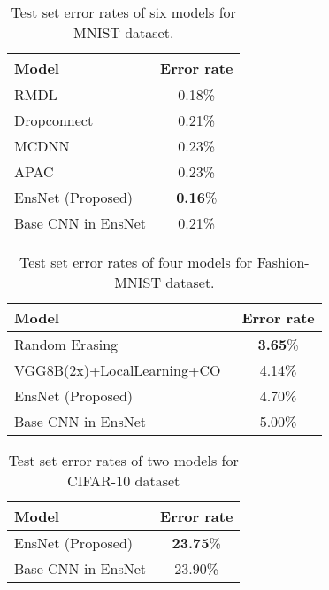 \documentclass[a4j]{article}
\begin{document}
\begin{table}[t]
  \centering
  \caption{Test set error rates of six models for MNIST dataset.}
  \begin{tabular}[t]{|l|c|} \hline
    Model & Error rate\\
    \hline \hline
    RMDL~\cite{RMDL} & 0.18\%\\ \hline
    Dropconnect~\cite{Dropconnect} & 0.21\%\\ \hline
    MCDNN~\cite{MCDNN} & 0.23\%\\ \hline
    APAC~\cite{APAC} & 0.23\%\\ \hline
    EnsNet (Proposed) & \textbf{0.16}\% \\ \hline
    Base CNN in EnsNet & 0.21\% \\ \hline
  \end{tabular}
  \label{tb:prediction-error1}
\end{table}

\begin{table}[t]
  \centering
  \caption{Test set error rates of four models for Fashion-MNIST dataset.}
  \begin{tabular}[t]{|l|c|} \hline
    Model & Error rate \\
    \hline \hline
    Random Erasing~\cite{RandomErasing} & \textbf{3.65}\% \\ \hline
    VGG8B(2x)+LocalLearning+CO~\cite{VGG8LCO} & 4.14\% \\ \hline
    EnsNet (Proposed) & 4.70\% \\ \hline
    Base CNN in EnsNet & 5.00\%\\ \hline
  \end{tabular}
  \label{tb:prediction-error2}
\end{table}

\begin{table}[t]
  \centering
  \caption{Test set error rates of two models for CIFAR-10 dataset}
  \begin{tabular}{|l|c|} \hline
    Model & Error rate \\
    \hline \hline
    EnsNet (Proposed) & \textbf{23.75}\% \\ \hline
    Base CNN in EnsNet & 23.90\%\\ \hline
  \end{tabular}
  \label{tb:prediction-error3}
\end{table}
\end{document}
